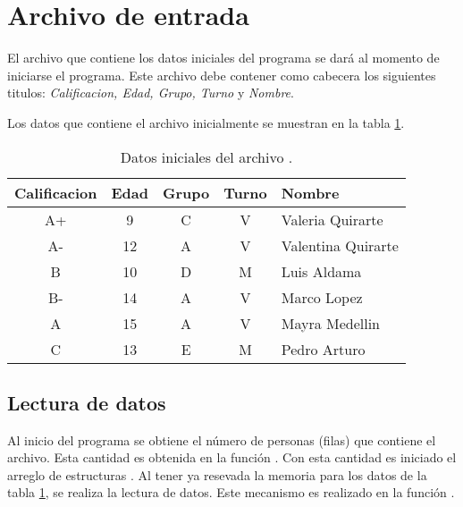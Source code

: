 \section{Archivo de entrada \label{sec:read_file}}

El archivo que contiene los datos iniciales del programa se dará al momento de iniciarse el programa. Este archivo debe contener como cabecera los siguientes titulos: \textit{Calificacion, Edad, Grupo, Turno} y \textit{Nombre}.

Los datos que contiene el archivo inicialmente se muestran en la tabla \ref{table:initial_data}.

\begin{table}[H]
    \centering
    \begin{tabular}{ccccl} \hline
        Calificacion & Edad & Grupo & Turno & Nombre             \\ \hline
        A+           & 9    & C     & V     & Valeria Quirarte   \\
        A-           & 12   & A     & V     & Valentina Quirarte \\
        B            & 10   & D     & M     & Luis Aldama        \\
        B-           & 14   & A     & V     & Marco Lopez        \\
        A            & 15   & A     & V     & Mayra Medellin     \\
        C            & 13   & E     & M     & Pedro Arturo       \\ \hline
    \end{tabular}
    \caption{Datos iniciales del archivo .}
    \label{table:initial_data}
\end{table}

\subsection{Lectura de datos}

Al inicio del programa se obtiene el número de personas (filas) que contiene el archivo. Esta cantidad es obtenida en la función . Con esta cantidad es iniciado el arreglo de estructuras . Al tener ya resevada la memoria para los datos de la tabla \ref{table:initial_data}, se realiza la lectura de datos. Este mecanismo es realizado en la función .